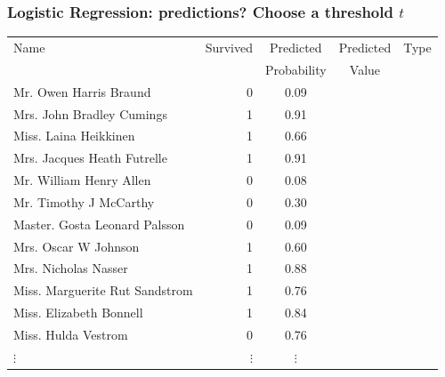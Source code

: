 \documentclass[aspectratio=169]{beamer}
\theoremstyle{principle}
\begin{document}
\begin{frame}
\frametitle{Logistic Regression: predictions?  Choose a threshold $t$}

\begin{table}[ht]
\centering
\begin{tabular}{l | r | c | c | c}

 Name & Survived & Predicted & Predicted &Type\\ 
&&Probability&Value\\
  \hline
  \hline
 Mr. Owen Harris Braund &   0 & 0.09 &&\\ 
 Mrs. John Bradley Cumings &   1 & 0.91 &&\\ 
 Miss. Laina Heikkinen &   1 & 0.66 &&\\ 
 Mrs. Jacques Heath Futrelle &   1 & 0.91 &&\\ 
 Mr. William Henry Allen &   0 & 0.08 &&\\ 
 Mr. Timothy J McCarthy &   0 & 0.30 &&\\ 
 Master. Gosta Leonard Palsson &   0 & 0.09 &&\\ 
 Mrs. Oscar W Johnson &   1 & 0.60 &&\\ 
 Mrs. Nicholas Nasser &   1 & 0.88 &&\\ 
 Miss. Marguerite Rut Sandstrom &   1 & 0.76 &&\\ 
 Miss. Elizabeth Bonnell &   1 & 0.84 &&\\ 
 Miss. Hulda Vestrom &   0 & 0.76 &&\\ 
$\vdots$ & $\vdots$ & $\vdots$ &  &
\end{tabular}
\end{table}

\end{frame}
\end{document}
